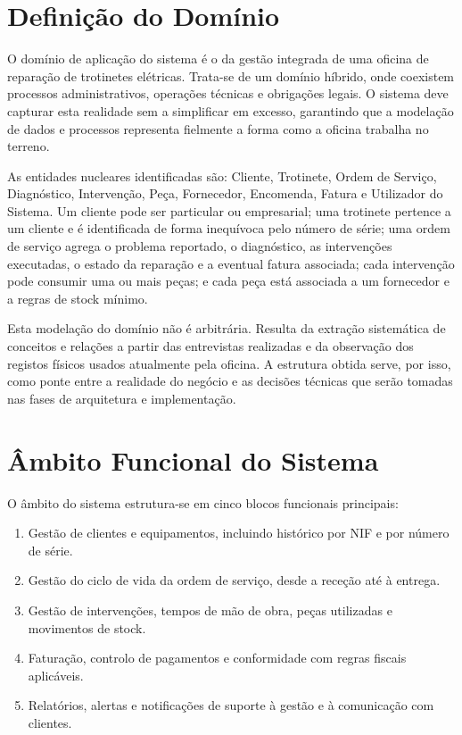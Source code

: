 \documentclass[a4paper,12pt]{scrreprt}
\begin{document}
    \section{Definição do Domínio}
        O domínio de aplicação do sistema é o da gestão integrada de uma oficina de reparação de trotinetes elétricas. Trata-se de um domínio híbrido, onde coexistem processos administrativos, operações técnicas e obrigações legais. O sistema deve capturar esta realidade sem a simplificar em excesso, garantindo que a modelação de dados e processos representa fielmente a forma como a oficina trabalha no terreno.

        As entidades nucleares identificadas são: Cliente, Trotinete, Ordem de Serviço, Diagnóstico, Intervenção, Peça, Fornecedor, Encomenda, Fatura e Utilizador do Sistema. Um cliente pode ser particular ou empresarial; uma trotinete pertence a um cliente e é identificada de forma inequívoca pelo número de série; uma ordem de serviço agrega o problema reportado, o diagnóstico, as intervenções executadas, o estado da reparação e a eventual fatura associada; cada intervenção pode consumir uma ou mais peças; e cada peça está associada a um fornecedor e a regras de stock mínimo.

        Esta modelação do domínio não é arbitrária. Resulta da extração sistemática de conceitos e relações a partir das entrevistas realizadas e da observação dos registos físicos usados atualmente pela oficina. A estrutura obtida serve, por isso, como ponte entre a realidade do negócio e as decisões técnicas que serão tomadas nas fases de arquitetura e implementação.

    \section{Âmbito Funcional do Sistema}
        O âmbito do sistema estrutura-se em cinco blocos funcionais principais:

        \begin{enumerate}
            \item Gestão de clientes e equipamentos, incluindo histórico por NIF e por número de série.
            \item Gestão do ciclo de vida da ordem de serviço, desde a receção até à entrega.
            \item Gestão de intervenções, tempos de mão de obra, peças utilizadas e movimentos de stock.
            \item Faturação, controlo de pagamentos e conformidade com regras fiscais aplicáveis.
            \item Relatórios, alertas e notificações de suporte à gestão e à comunicação com clientes.
        \end{enumerate}
\end{document}
